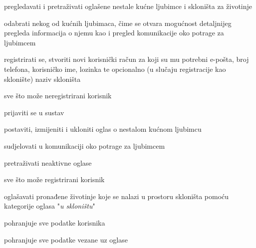 			
			\begin{packed_enum}
				\item  {}
				
				\begin{packed_enum}
					
					\item pregledavati i pretraživati oglašene nestale kućne ljubimce i skloništa za životinje
					\item odabrati nekog od kućnih ljubimaca, čime se otvara mogućnost detaljnijeg pregleda informacija o njemu kao i pregled komunikacije oko potrage za ljubimcem
					\item registrirati se, stvoriti novi korisnički račun za koji su mu potrebni e-pošta, broj telefona, korisničko ime, lozinka te opcionalno (u slučaju registracije kao sklonište) naziv skloništa
					
				\end{packed_enum}
			
				\item  {}
				
				\begin{packed_enum}
					
					\item sve što može neregistrirani korisnik
					\item prijaviti se u sustav
					\item postaviti, izmijeniti i ukloniti oglas o nestalom kućnom ljubimcu
					\item sudjelovati u komunikaciji oko potrage za ljubimcem
					\item pretraživati neaktivne oglase
					
				\end{packed_enum}
			
			\item  {}
				
				\begin{packed_enum}
				
					\item sve što može registrirani korisnik
					\item oglašavati pronađene životinje koje se nalazi u prostoru skloništa pomoću kategorije oglasa "\textit{u skloništu}"
					
				\end{packed_enum}
			
			\item  {}
				
				\begin{packed_enum}
					
					\item pohranjuje sve podatke korisnika
					\item pohranjuje sve podatke vezane uz oglase
					
				\end{packed_enum}
			\end{packed_enum}
			
